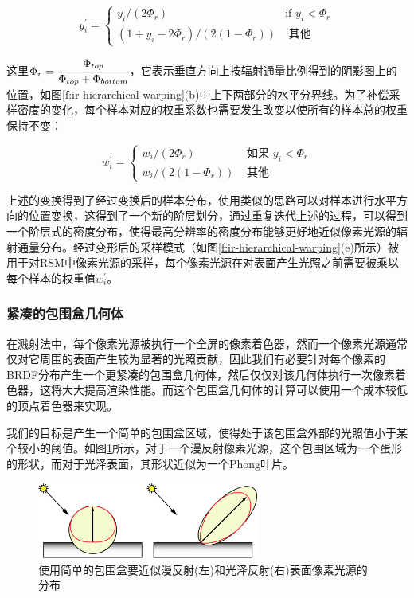 \begin{equation}
	y^{'}_i=\begin{cases}
		y_i/(2\Phi_r) &\text{if }y_i<\Phi_r\\
		(1+y_i-2\Phi_r)/(2(1-\Phi_r)) & \text{ 其他}
	\end{cases}
\end{equation}

\noindent 这里$\Phi_r= \cfrac{\Phi_{top}}{\Phi_{top}+\Phi_{bottom}}$，它表示垂直方向上按辐射通量比例得到的阴影图上的位置，如图\ref{f:ir-hierarchical-warping}(b)中上下两部分的水平分界线。为了补偿采样密度的变化，每个样本对应的权重系数也需要发生改变以使所有的样本总的权重保持不变：

\begin{equation}
	w^{'}_i=\begin{cases}
		w_i/(2\Phi_r)     & \text{ 如果 }y_i<\Phi_r \\
		w_i/(2(1-\Phi_r)) & \text{ 其他}
	\end{cases}
\end{equation}

上述的变换得到了经过变换后的样本分布，使用类似的思路可以对样本进行水平方向的位置变换，这得到了一个新的阶层划分，通过重复迭代上述的过程，可以得到一个阶层式的密度分布，使得最高分辨率的密度分布能够更好地近似像素光源的辐射通量分布。经过变形后的采样模式（如图\ref{f:ir-hierarchical-warping}(e)所示）被用于对RSM中像素光源的采样，每个像素光源在对表面产生光照之前需要被乘以每个样本的权重值$w^{'}_i$。




\subsubsection{紧凑的包围盒几何体}
在溅射法中，每个像素光源被执行一个全屏的像素着色器，然而一个像素光源通常仅对它周围的表面产生较为显著的光照贡献，因此我们有必要针对每个像素的BRDF分布产生一个更紧凑的包围盒几何体，然后仅仅对该几何体执行一次像素着色器，这将大大提高渲染性能。而这个包围盒几何体的计算可以使用一个成本较低的顶点着色器来实现。

我们的目标是产生一个简单的包围盒区域，使得处于该包围盒外部的光照值小于某个较小的阈值。如图\ref{f:ir-bounding-geometry}所示，对于一个漫反射像素光源，这个包围区域为一个蛋形的形状，而对于光泽表面，其形状近似为一个Phong叶片。

\begin{figure}
	\sidecaption
		\includegraphics[width=0.65\textwidth]{figures/ir/ir-3-3}
	\caption{使用简单的包围盒要近似漫反射(左)和光泽反射(右)表面像素光源的分布}
	\label{f:ir-bounding-geometry}
\end{figure}


